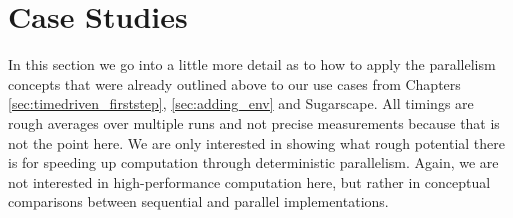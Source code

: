 \section{Case Studies}
In this section we go into a little more detail as to how to apply the parallelism concepts that were already outlined above to our use cases from Chapters \ref{sec:timedriven_firststep}, \ref{sec:adding_env} and Sugarscape. All timings are rough averages over multiple runs and not precise measurements because that is not the point here. We are only interested in showing what rough potential there is for speeding up computation through deterministic parallelism. Again, we are not interested in high-performance computation here, but rather in conceptual comparisons between sequential and parallel implementations.




\\

